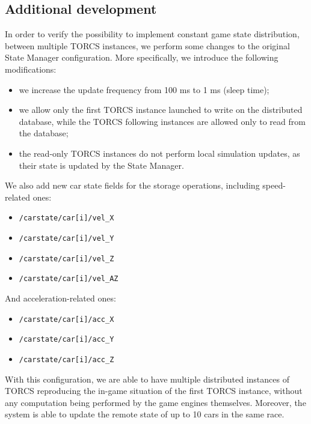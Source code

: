 \subsection{Additional development}\label{state-manager-next}
In order to verify the possibility to implement constant game state distribution, between multiple TORCS instances, we perform some changes to the original State Manager configuration. More specifically, we introduce the following modifications:
\begin{itemize}
	\item we increase the update frequency from 100 ms to 1 ms (sleep time);
	\item we allow only the first TORCS instance launched to write on the distributed database, while the TORCS following instances are allowed only to read from the database;
	\item the read-only TORCS instances do not perform local simulation updates, as their state is updated by the State Manager.
\end{itemize}
We also add new car state fields for the storage operations, including speed-related ones:
\begin{itemize}
	\item \texttt{/carstate/car[i]/vel\_X}
	\item \texttt{/carstate/car[i]/vel\_Y}
	\item \texttt{/carstate/car[i]/vel\_Z}
	\item \texttt{/carstate/car[i]/vel\_AZ}
\end{itemize}
And acceleration-related ones:
\begin{itemize}
	\item \texttt{/carstate/car[i]/acc\_X}
	\item \texttt{/carstate/car[i]/acc\_Y}
	\item \texttt{/carstate/car[i]/acc\_Z}
\end{itemize}
With this configuration, we are able to have multiple distributed instances of TORCS reproducing the in-game situation of the first TORCS instance, without any computation being performed by the game engines themselves. Moreover, the system is able to update the remote state of up to 10 cars in the same race.